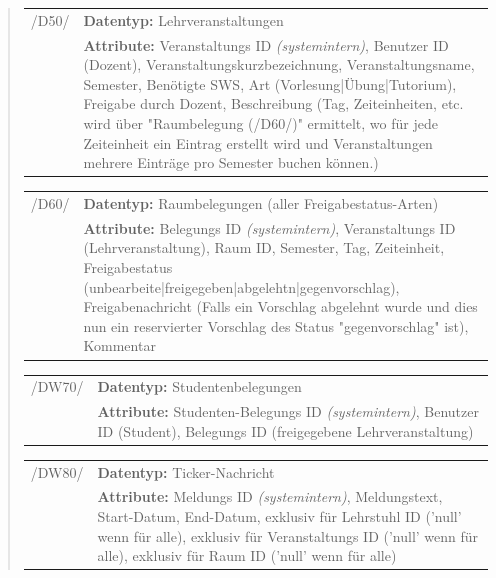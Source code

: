 \begin{quote}
\begin{tabular}{p{1.5cm}p{14.5cm}}
	 /D50/	& \textbf{Datentyp:} Lehrveranstaltungen \\
				& \textbf{Attribute:} Veranstaltungs ID \textsl{(systemintern)}, Benutzer ID (Dozent), Veranstaltungskurzbezeichnung, Veranstaltungsname, Semester, Benötigte SWS, Art (Vorlesung|Übung|Tutorium), Freigabe durch Dozent, Beschreibung (Tag, Zeiteinheiten, etc. wird über "Raumbelegung (/D60/)" ermittelt, wo für jede Zeiteinheit ein Eintrag erstellt wird und Veranstaltungen mehrere Einträge pro Semester buchen können.) \\[0.25cm]

\end{tabular}


\begin{tabular}{p{1.5cm}p{14.5cm}}
					
	 /D60/	& \textbf{Datentyp:} Raumbelegungen (aller Freigabestatus-Arten) \\
				& \textbf{Attribute:} Belegungs ID \textsl{(systemintern)}, Veranstaltungs ID (Lehrveranstaltung), Raum ID, Semester, Tag, Zeiteinheit, Freigabestatus (unbearbeite|freigegeben|abgelehtn|gegenvorschlag), Freigabenachricht (Falls ein Vorschlag abgelehnt wurde und dies nun ein reservierter Vorschlag des Status "gegenvorschlag" ist), Kommentar  \\[0.25cm]

\end{tabular}


\begin{tabular}{p{1.5cm}p{14.5cm}}
		
	 /DW70/& \textbf{Datentyp:} Studentenbelegungen \\
				& \textbf{Attribute:} Studenten-Belegungs ID \textsl{(systemintern)}, Benutzer ID (Student), Belegungs ID (freigegebene Lehrveranstaltung) \\[0.25cm]

\end{tabular}


\begin{tabular}{p{1.5cm}p{14.5cm}}
					
	 /DW80/& \textbf{Datentyp:} Ticker-Nachricht \\
				& \textbf{Attribute:} Meldungs ID \textsl{(systemintern)}, Meldungstext, Start-Datum, End-Datum, exklusiv für Lehrstuhl ID ('null' wenn für alle), exklusiv für Veranstaltungs ID ('null' wenn für alle), exklusiv für Raum ID ('null' wenn für alle) \\[0.25cm]
		
\end{tabular}



\end{quote}
